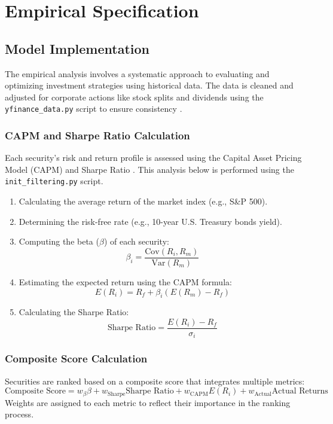 \section{Empirical Specification}

\subsection{Model Implementation}
The empirical analysis involves a systematic approach to evaluating and optimizing investment strategies using historical data. The data is cleaned and adjusted for corporate actions like stock splits and dividends using the \texttt{yfinance\_data.py} script to ensure consistency \citep{yfinance}.

\subsubsection{CAPM and Sharpe Ratio Calculation}
Each security's risk and return profile is assessed using the Capital Asset Pricing Model (CAPM) and Sharpe Ratio \citep{sharpe1966mutual}. This analysis below is performed using the \texttt{init\_filtering.py} script.
\begin{enumerate}
    \item Calculating the average return of the market index (e.g., S\&P 500).
    \item Determining the risk-free rate (e.g., 10-year U.S. Treasury bonds yield).
    \item Computing the beta (\(\beta\)) of each security:
    \begin{equation}
        \beta_i = \frac{\text{Cov}(R_i, R_m)}{\text{Var}(R_m)}
    \end{equation}
    \item Estimating the expected return using the CAPM formula:
    \begin{equation}
        E(R_i) = R_f + \beta_i (E(R_m) - R_f)
    \end{equation}
    \item Calculating the Sharpe Ratio:
    \begin{equation}
        \text{Sharpe Ratio} = \frac{E(R_i) - R_f}{\sigma_i}
    \end{equation}
\end{enumerate}

\subsubsection{Composite Score Calculation}
Securities are ranked based on a composite score that integrates multiple metrics:
\begin{equation}
    \text{Composite Score} = w_{\beta} \beta + w_{\text{Sharpe}} \text{Sharpe Ratio} + w_{\text{CAPM}} E(R_i) + w_{\text{Actual}} \text{Actual Returns}
\end{equation}
Weights are assigned to each metric to reflect their importance in the ranking process.

